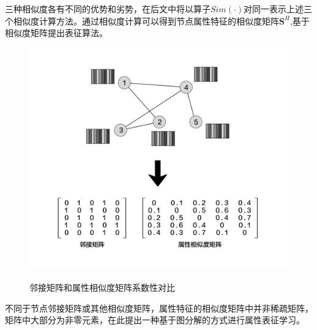 三种相似度各有不同的优势和劣势，在后文中将以算子$Sim(\cdot)$对同一表示上述三个相似度计算方法。通过相似度计算可以得到节点属性特征的相似度矩阵$\textbf{S}^H$,基于相似度矩阵提出表征算法。
\begin{figure}[!ht]
	\begin{center}
		{\includegraphics[width=5in]{figures/attributed_matrix.png}}
		\caption{邻接矩阵和属性相似度矩阵系数性对比}
	\end{center}
\end{figure}

不同于节点邻接矩阵或其他相似度矩阵，属性特征的相似度矩阵中并非稀疏矩阵，矩阵中大部分为非零元素，在此提出一种基于图分解的方式进行属性表征学习。
